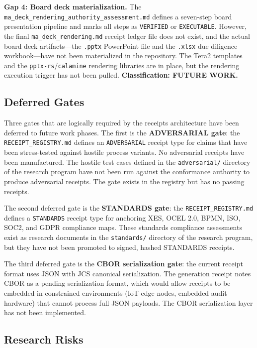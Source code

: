 \textbf{Gap 4: Board deck materialization.} The \texttt{ma\_deck\_rendering\_authority\_assessment.md}
defines a seven-step board presentation pipeline and marks all steps as \texttt{VERIFIED}
or \texttt{EXECUTABLE}. However, the final \texttt{ma\_deck\_rendering.md} receipt ledger
file does not exist, and the actual board deck artifacts---the \texttt{.pptx} PowerPoint
file and the \texttt{.xlsx} due diligence workbook---have not been materialized in the
repository. The Tera2 templates and the \texttt{pptx-rs}/\texttt{calamine} rendering
libraries are in place, but the rendering execution trigger has not been pulled.
\textbf{Classification: FUTURE WORK.}

\subsection{Deferred Gates}
\label{sec:receipts-questions-deferred}

Three gates that are logically required by the receipts architecture have been deferred
to future work phases. The first is the \textbf{ADVERSARIAL gate}: the
\texttt{RECEIPT\_REGISTRY.md} defines an \texttt{ADVERSARIAL} receipt type for claims
that have been stress-tested against hostile process variants. No adversarial receipts
have been manufactured. The hostile test cases defined in the
\texttt{adversarial/} directory of the research program have not been run against the
conformance authority to produce adversarial receipts. The gate exists in the registry
but has no passing receipts.

The second deferred gate is the \textbf{STANDARDS gate}: the \texttt{RECEIPT\_REGISTRY.md}
defines a \texttt{STANDARDS} receipt type for anchoring XES, OCEL 2.0, BPMN, ISO, SOC2,
and GDPR compliance maps. These standards compliance assessments exist as research documents
in the \texttt{standards/} directory of the research program, but they have not been
promoted to signed, hashed STANDARDS receipts.

The third deferred gate is the \textbf{CBOR serialization gate}: the current receipt
format uses JSON with JCS canonical serialization. The generation receipt notes CBOR
as a pending serialization format, which would allow receipts to be embedded in
constrained environments (IoT edge nodes, embedded audit hardware) that cannot process
full JSON payloads. The CBOR serialization layer has not been implemented.

\subsection{Research Risks}
\label{sec:receipts-questions-risks}

